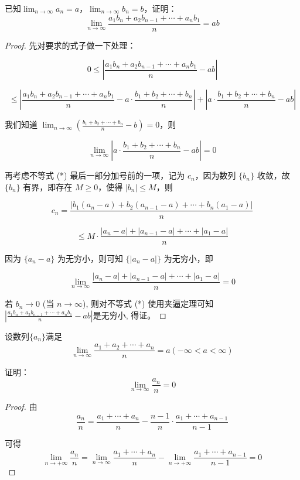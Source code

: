 \documentclass[lang=cn,12pt]{elegantbook}
\begin{document}
\begin{example}
    已知$\lim_{n \to \infty} a_n = a$，$\lim_{n \to \infty} b_n = b$，证明：
\[
\lim_{n \to \infty} \frac{a_1b_n + a_2b_{n-1}+ \cdots + a_nb_1}{n} = ab
\]
\end{example}

\begin{proof}
    先对要求的式子做一下处理：

\[
0 \leq \left| \frac{a_1b_n + a_2b_{n-1} + \cdots + a_nb_1}{n} - ab \right|
\]

\[
\leq \left| \frac{a_1b_n + a_2b_{n-1} + \cdots + a_nb_1}{n} - a \cdot \frac{b_1 + b_2 + \cdots + b_n}{n} \right|
+ \left| a \cdot \frac{b_1 + b_2 + \cdots + b_n}{n} - ab \right| \tag{*}
\]

我们知道 \(\lim_{n \to \infty} \left( \frac{b_1 + b_2 + \cdots + b_n}{n} - b \right) = 0\)，则

\[
\lim_{n \to \infty} \left| a \cdot \frac{b_1 + b_2 + \cdots + b_n}{n} - ab \right| = 0
\]

再考虑不等式 (*) 最后一部分加号前的一项，记为 \( c_n \)，因为数列 \(\{b_n\}\) 收敛，故 \(\{b_n\}\) 有界，即存在 \( M \geq 0 \)，使得 \( |b_n| \leq M \)，则

\[
c_n = \frac{|b_1(a_n - a) + b_2(a_{n-1} - a) + \cdots + b_n(a_1 - a)|}{n}
\]

\[
\leq M \cdot \frac{|a_n - a| + |a_{n-1} - a| + \cdots + |a_1 - a|}{n}
\]

因为 \(\{a_n - a\}\) 为无穷小，则可知 \(\{|a_n - a|\}\) 为无穷小，即

\[
\lim_{n \to \infty} \frac{|a_n - a| + |a_{n-1} - a| + \cdots + |a_1 - a|}{n} = 0
\]

若 \( b_n \to 0 \) (当 \( n \to \infty \)), 则对不等式 (*) 使用夹逼定理可知$\left| \frac{a_1b_n + a_2b_{n-1} + \cdots + a_nb_1}{n} - ab \right|$是无穷小, 得证。



\end{proof}

\begin{example}
    设数列$\{a_n\}$满足\[\lim_{n \to \infty}\frac{a_1+a_2+\cdots +a_n}{n}=a(-\infty<a<\infty)\] \par 证明：\[\lim_{n \to \infty}\frac{a_n}{n}=0\]
\end{example}
\begin{proof}
     由  
\[
\frac{a_n}{n} = \frac{a_1 + \cdots + a_n}{n} - \frac{n-1}{n} \cdot \frac{a_1 + \cdots + a_{n-1}}{n-1}
\]  

可得  
\[
\lim_{n \to +\infty} \frac{a_n}{n} = \lim_{n \to \infty} \frac{a_1 + \cdots + a_n}{n} - \lim_{n \to +\infty} \frac{a_1 + \cdots + a_{n-1}}{n-1} = 0
\]

\end{proof}
\end{document}
